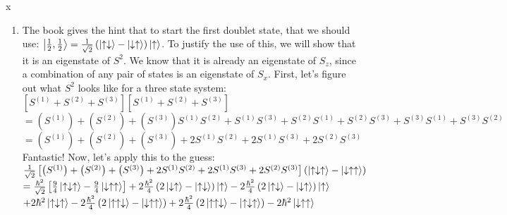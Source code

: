 x\documentclass[12pt]{article}
\begin{document}
\begin{enumerate}[label=\alph*)]
\item The book gives the hint that to start the first doublet state, that we should use: $\ket{\frac{1}{2}, \frac{1}{2}} = \frac{1}{\sqrt{2}}\left(\ket{\uparrow\downarrow} - \ket{\downarrow\uparrow}\right)\ket{\uparrow}$. To justify the use of this, we will show that it is an eigenstate of $S^2$. We know that it is already an eigenstate of $S_z$, since a combination of any pair of states is an eigenstate of $S_x$. First, let's figure out what $S^2$ looks like for a three state system:\vspace{0.5em}\\
$\left[S^{(1)} + S^{(2)} + S^{(3)}\right]\left[S^{(1)} + S^{(2)} + S^{(3)}\right]$\vspace{0.5em}\\
$= \left(S^{(1)}\right) + \left(S^{(2)}\right) + \left(S^{(3)}\right) S^{(1)}S^{(2)} + S^{(1)}S^{(3)} + S^{(2)}S^{(1)} + S^{(2)}S^{(3)} + S^{(3)}S^{(1)} + S^{(3)}S^{(2)}$\vspace{0.5em}\\
$= \left(S^{(1)}\right) + \left(S^{(2)}\right) + \left(S^{(3)}\right) + 2 S^{(1)}S^{(2)} + 2S^{(1)}S^{(3)} + 2S^{(2)}S^{(3)}$\vspace{0.5em}\\
Fantastic! Now, let's apply this to the guess:\vspace{0.5em}\\
$\frac{1}{\sqrt{2}}\left[\left(S^{(1)}\right) + \left(S^{(2)}\right) + \left(S^{(3)}\right) + 2 S^{(1)}S^{(2)} + 2S^{(1)}S^{(3)} + 2S^{(2)}S^{(3)}\right]\left(\ket{\uparrow\downarrow\uparrow} - \ket{\downarrow\uparrow\uparrow}\right)$\vspace{0.5em}\\
$=\frac{\hbar^2}{\sqrt{2}}\left[\frac{9}{4}\ket{\uparrow\downarrow\uparrow} - \frac{9}{4}\ket{\downarrow\uparrow\uparrow}\right] + 2 \frac{\hbar^2}{4}\left(2\ket{\downarrow\uparrow} - \ket{\uparrow\downarrow}\right)\ket{\uparrow} - 2\frac{\hbar^2}{4}\left(2\ket{\uparrow\downarrow} - \ket{\downarrow\uparrow}\right)\ket{\uparrow} $\vspace{0.5em}\\
\hspace*{3em}$+ 2\hbar^2\ket{\uparrow\downarrow\uparrow} - 2\frac{\hbar^2}{4}\left(2\ket{\uparrow\uparrow\downarrow} - \ket{\downarrow\uparrow\uparrow}\right) + 2 \frac{\hbar^2}{4}\left(2\ket{\uparrow\uparrow\downarrow} - \ket{\uparrow\downarrow\uparrow}\right) - 2\hbar^2\ket{\downarrow\uparrow\uparrow}$\vspace{0.5em}\\

\end{enumerate}
\end{document}
